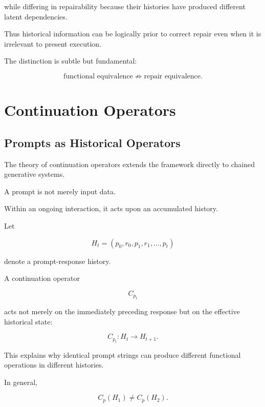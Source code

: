 \documentclass[11pt]{article}
\theoremstyle{remark}
\begin{document}
while differing in repairability because their histories have produced different latent dependencies.

Thus historical information can be logically prior to correct repair even when it is irrelevant to present execution.

The distinction is subtle but fundamental:

\begin{equation}
\boxed{
\text{functional equivalence}
\not\Rightarrow
\text{repair equivalence}.
}
\end{equation}

\section{Continuation Operators}

\subsection{Prompts as Historical Operators}

The theory of continuation operators extends the framework directly to chained generative systems.

A prompt is not merely input data.

Within an ongoing interaction, it acts upon an accumulated history.

Let

\begin{equation}
H_t
=
(p_0,r_0,p_1,r_1,\ldots,p_t)
\end{equation}

denote a prompt-response history.

A continuation operator

\begin{equation}
C_{p_t}
\end{equation}

acts not merely on the immediately preceding response but on the effective historical state:

\begin{equation}
C_{p_t}:H_t\rightarrow H_{t+1}.
\end{equation}

This explains why identical prompt strings can produce different functional operations in different histories.

In general,

\begin{equation}
C_p(H_1)\neq C_p(H_2).
\end{equation}
\end{document}
